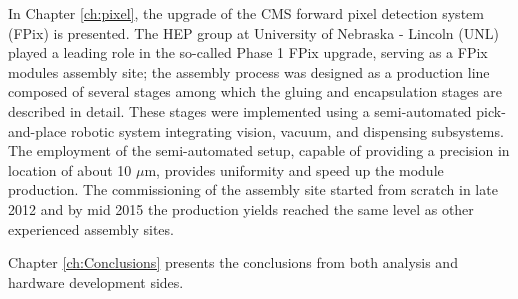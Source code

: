 In Chapter \ref{ch:pixel}, the upgrade of the CMS forward pixel detection system (FPix) is presented. The HEP group at University of Nebraska - Lincoln (UNL) played a leading role in the so-called Phase 1 FPix upgrade, serving as a FPix modules assembly site; the assembly process was designed as a production line composed of several stages among which the gluing and encapsulation stages are described in detail. These stages were implemented using a semi-automated pick-and-place robotic system integrating vision, vacuum, and dispensing subsystems. The employment of the semi-automated setup, capable of providing a precision in location of about 10 $\mu$m, provides uniformity and speed up the module production. The commissioning of the assembly site started from scratch in late 2012 and by mid 2015 the production yields reached the same level as other experienced assembly sites.

Chapter \ref{ch:Conclusions} presents the conclusions from both analysis and hardware development sides.

